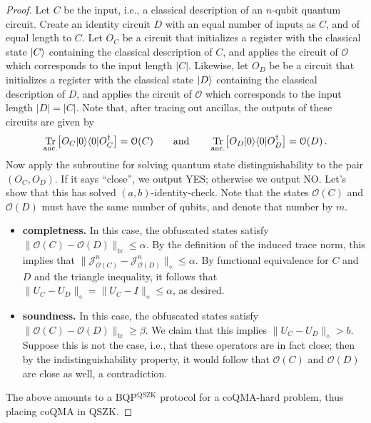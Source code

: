 \documentclass[11pt]{article}
\DeclareMathOperator{\tr}{Tr}
\numberwithin{equation}{section}
\begin{document}
{\begin{proof}
Let $C$ be the input, i.e., a classical description of an $n$-qubit quantum circuit. Create an identity circuit $D$ with an equal number of inputs as $C$, and of equal length to $C$. Let $O_C$ be a circuit that initializes a register with the classical state ${\left\vert{C}\right\rangle}$ containing the classical description of $C$, and applies the circuit of $\mathcal O$ which corresponds to the input length $|C|$. Likewise, let $O_D$ be be a circuit that initializes a register with the classical state ${\left\vert{D}\right\rangle}$ containing the classical description of $D$, and applies the circuit of $\mathcal O$ which corresponds to the input length $|D| = |C|$. Note that, after tracing out ancillas, the outputs of these circuits are given by
$$
\tr_\text{anc.} \bigl[O_C\ket{0}\bra{0}O_C^\dagger\bigr] = \mathcal O(C)
\qquad \text{and} \qquad
\tr_\text{anc.} \bigl[O_D\ket{0}\bra{0}O_D^\dagger\bigr] = \mathcal O(D)\,.
$$
Now apply the subroutine for solving quantum state distinguishability to the pair $(O_C, O_D)$. If it says ``close'', we output YES; otherwise we output NO. Let's show that this has solved $(a, b)$-identity-check. Note that the states $\mathcal O(C)$ and $\mathcal O(D)$ must have the same number of qubits, and denote that number by $m$.
\begin{itemize}
\item \textbf{completness.} In this case, the obfuscated states satisfy $\|\mathcal O(C) - \mathcal O(D)\|_\text{tr} \leq \alpha$.  By the definition of the induced trace norm, this implies that $\|\mathcal J_{\mathcal O(C)}^n - \mathcal J_{\mathcal O(D)}^n\|_\diamond \leq \alpha$. By functional equivalence for $C$ and $D$ and the triangle inequality, it follows that $\|U_C - U_D\|_\diamond = \|U_C - I\|_\diamond \leq \alpha$, as desired.

\item \textbf{soundness.} In this case, the obfuscated states satisfy $\|\mathcal O(C) - \mathcal O(D)\|_\text{tr} \geq \beta$. We claim that this implies $\|U_C - U_D\|_\diamond > b$. Suppose this is not the case, i.e., that these operators are in fact close; then by the indistinguishability property, it would follow that $\mathcal O(C)$ and $\mathcal O(D)$ are close as well, a contradiction.
\end{itemize}
The above amounts to a BQP$^\text{QSZK}$ protocol for a coQMA-hard problem, thus placing coQMA in QSZK.
\end{proof}

}
\end{document}
